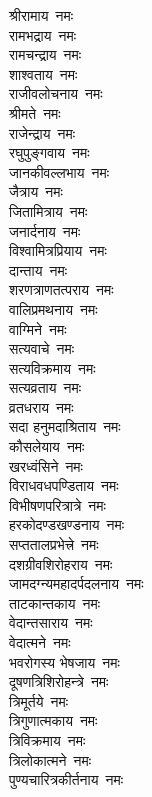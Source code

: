 \begin{multicols}{2}
\begin{flushleft}
श्रीरामाय~नमः\\
रामभद्राय~नमः\\
रामचन्द्राय~नमः\\
शाश्वताय~नमः\\
राजीवलोचनाय~नमः\\
श्रीमते~नमः\\
राजेन्द्राय~नमः\\
रघुपुङ्गवाय~नमः\\
जानकीवल्लभाय~नमः\\
जैत्राय~नमः\hfill{}\\
जितामित्राय~नमः\\
जनार्दनाय~नमः\\
विश्वामित्रप्रियाय~नमः\\
दान्ताय~नमः\\
शरणत्राणतत्पराय~नमः\\
वालिप्रमथनाय~नमः\\
वाग्मिने~नमः\\
सत्यवाचे~नमः\\
सत्यविक्रमाय~नमः\\
सत्यव्रताय~नमः\hfill{}\\
व्रतधराय~नमः\\
सदा हनुमदाश्रिताय~नमः\\
कौसलेयाय~नमः\\
खरध्वंसिने~नमः\\
विराधवधपण्डिताय~नमः\\
विभीषणपरित्रात्रे~नमः\\
हरकोदण्डखण्डनाय~नमः\\
सप्ततालप्रभेत्त्रे~नमः\\
दशग्रीवशिरोहराय~नमः\\
जामदग्न्यमहादर्पदलनाय~नमः\hfill{}\\
ताटकान्तकाय~नमः\\
वेदान्तसाराय~नमः\\
वेदात्मने~नमः\\
भवरोगस्य भेषजाय~नमः\\
दूषणत्रिशिरोहन्त्रे~नमः\\
त्रिमूर्तये~नमः\\
त्रिगुणात्मकाय~नमः\\
त्रिविक्रमाय~नमः\\
त्रिलोकात्मने~नमः\\
पुण्यचारित्रकीर्तनाय~नमः\hfill{}\\

\end{flushleft}
\end{multicols}
